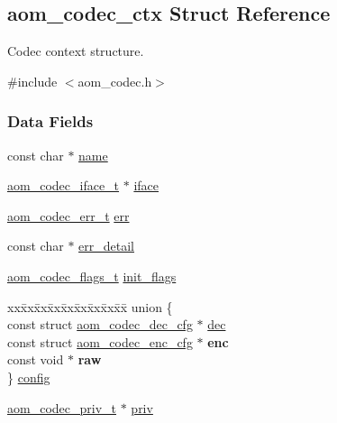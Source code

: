 \hypertarget{structaom__codec__ctx}{}\subsection{aom\+\_\+codec\+\_\+ctx Struct Reference}
\label{structaom__codec__ctx}


Codec context structure.  




{\ttfamily \#include $<$aom\+\_\+codec.\+h$>$}

\subsubsection*{Data Fields}
\begin{DoxyCompactItemize}
\item 
const char $\ast$ \hyperlink{structaom__codec__ctx_a3aa8abff3e05d2fbbf4f5a9fa0575f2b}{name}
\item 
\hyperlink{group__codec_ga4ef55b44c762836d1550e11921bed403}{aom\+\_\+codec\+\_\+iface\+\_\+t} $\ast$ \hyperlink{structaom__codec__ctx_a49c3517c6879e8b57061496078cfd040}{iface}
\item 
\hyperlink{group__codec_gaaae61e0f8663e6137f1e228757248e7c}{aom\+\_\+codec\+\_\+err\+\_\+t} \hyperlink{structaom__codec__ctx_a4cf9c265a7c34e92bb02d04aa3cab718}{err}
\item 
const char $\ast$ \hyperlink{structaom__codec__ctx_ad152db82a10b68df869ccb29370dae00}{err\+\_\+detail}
\item 
\hyperlink{group__codec_ga18f2242c1afca329581fbd3f2c81721b}{aom\+\_\+codec\+\_\+flags\+\_\+t} \hyperlink{structaom__codec__ctx_acb3a6528de757c4c862fa77619ef7e40}{init\+\_\+flags}
\item 
\begin{tabbing}
xx\=xx\=xx\=xx\=xx\=xx\=xx\=xx\=xx\=\kill
union \{\\
\>const struct \hyperlink{structaom__codec__dec__cfg}{aom\_codec\_dec\_cfg} $\ast$ \hyperlink{structaom__codec__ctx_a4b762ba3bde6bc72fddc9543adca33ef}{dec}\\
\>const struct \hyperlink{structaom__codec__enc__cfg}{aom\_codec\_enc\_cfg} $\ast$ {\bfseries enc}\\
\>const void $\ast$ {\bfseries raw}\\
\} \hyperlink{structaom__codec__ctx_ac6777025d3b72c9ab49adba78fc70b30}{config}\\

\end{tabbing}\item 
\hyperlink{group__codec_ga3671963ca4b3d6c2adbc186c8ed18023}{aom\+\_\+codec\+\_\+priv\+\_\+t} $\ast$ \hyperlink{structaom__codec__ctx_a9bd533e9da28ce73c8b787d4359ed337}{priv}
\end{DoxyCompactItemize}


